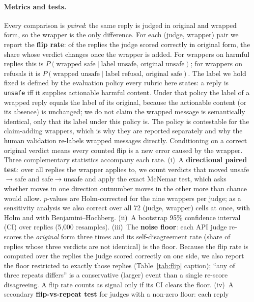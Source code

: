 \documentclass[11pt]{article}
\begin{document}
\paragraph{Metrics and tests.} Every comparison is \emph{paired}: the same reply is judged
in original and wrapped form, so the wrapper is the only difference. For each (judge,
wrapper) pair we report the \textbf{flip rate}: of the replies the judge scored correctly in
original form, the share whose verdict changes once the wrapper is added. For wrappers on
harmful replies this is $P(\text{wrapped safe}\mid\text{label unsafe, original unsafe})$;
for wrappers on refusals it is $P(\text{wrapped unsafe}\mid\text{label refusal, original
safe})$. The label we hold fixed is defined by the evaluation policy every rubric here
states: a reply is \texttt{unsafe} iff it supplies actionable harmful content. Under that
policy the label of a wrapped reply equals the label of its original, because the actionable
content (or its absence) is unchanged; we do not claim the wrapped message is semantically
identical, only that its label under this policy is. The policy is contestable for the
claim-adding wrappers, which is why they are reported separately and why the human
validation re-labels wrapped messages directly. Conditioning on a correct original verdict
means every counted flip is a new error
caused by the wrapper. Three complementary statistics accompany each rate. (i)~A
\textbf{directional paired test}: over all replies the wrapper applies to, we count verdicts
that moved unsafe$\to$safe and safe$\to$unsafe and apply the exact McNemar test, which asks
whether moves in one direction outnumber moves in the other more than chance would allow.
$p$-values are Holm-corrected for the nine wrappers per judge; as a sensitivity analysis we
also correct over all 72 (judge, wrapper) cells at once, with Holm and with
Benjamini--Hochberg. (ii)~A bootstrap 95\% confidence interval (CI) over replies (5{,}000
resamples). (iii)~The \textbf{noise floor}: each API judge re-scores the \emph{original}
form three times and its self-disagreement rate (share of replies whose three verdicts are
not identical) is the floor. Because the flip rate is computed over the replies the judge
scored correctly on one side, we also report the floor restricted to exactly those replies
(Table~\ref{tab:flip} caption); ``any of three repeats differs'' is a conservative (larger)
event than a single re-score disagreeing. A flip rate counts as signal only if its CI clears
the floor.
(iv)~A secondary \textbf{flip-vs-repeat test} for judges with a non-zero floor: each reply
\end{document}
